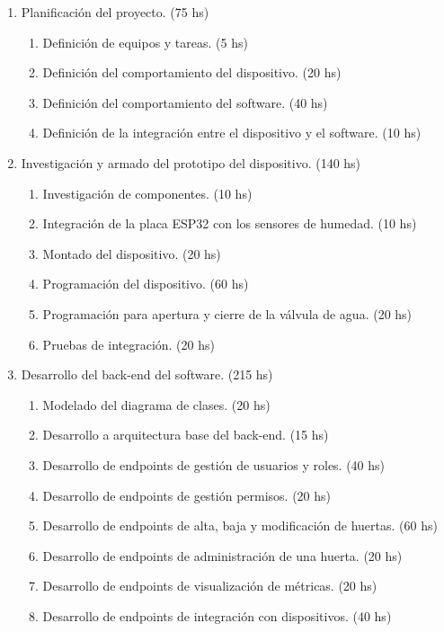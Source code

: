 \documentclass[
11pt, %
codirector, %
]{charter}
\begin{document}
\begin{enumerate}
\item Planificación del proyecto. (75 hs)
	\begin{enumerate}
	\item Definición de equipos y tareas. (5 hs)
	\item Definición del comportamiento del dispositivo. (20 hs)
	\item Definición del comportamiento del software. (40 hs)
	\item Definición de la integración entre el dispositivo y el software. (10 hs)
	\end{enumerate}
	
\item Investigación y armado del prototipo del dispositivo. (140 hs)
	\begin{enumerate}
	\item Investigación de componentes. (10 hs)
	\item Integración de la placa ESP32 con los sensores de humedad. (10 hs)
	\item Montado del dispositivo. (20 hs)
	\item Programación del dispositivo. (60 hs)
	\item Programación para apertura y cierre de la válvula de agua. (20 hs)
	\item Pruebas de integración. (20 hs)
	\end{enumerate}
	
\item Desarrollo del back-end del software. (215 hs)
	\begin{enumerate}
	\item Modelado del diagrama de clases. (20 hs)
	\item Desarrollo a arquitectura base del back-end. (15 hs)
	\item Desarrollo de endpoints de gestión de usuarios y roles. (40 hs)
	\item Desarrollo de endpoints de gestión permisos. (20 hs)
	\item Desarrollo de endpoints de alta, baja y modificación de huertas. (60 hs)
	\item Desarrollo de endpoints de administración de una huerta. (20 hs)
	\item Desarrollo de endpoints de visualización de métricas. (20 hs)
	\item Desarrollo de endpoints de integración con dispositivos. (40 hs)
	\end{enumerate}
	

\end{enumerate}
\end{document}
